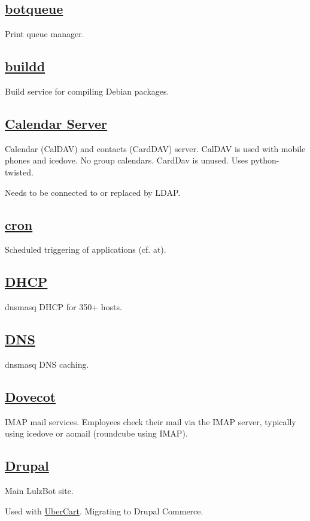 \subsection{\href{http://www.botqueue.org/}{botqueue}}
Print queue manager.

\subsection{\href{http://www.debian.org/}{buildd}}
Build service for compiling Debian packages.

\subsection{\href{http://www.calendarserver.org/}{Calendar Server}}
Calendar (CalDAV) and contacts (CardDAV) server. CalDAV is used with mobile
phones and icedove. No group calendars. CardDav is unused. Uses python-twisted.

Needs to be connected to or replaced by LDAP.

\subsection{\href{http://ftp.isc.org/isc/cron/}{cron}}
Scheduled triggering of applications (cf. at).

\subsection{\href{http://dnsmasq.org/}{DHCP}}
dnsmasq DHCP for 350+ hosts.

\subsection{\href{http://dnsmasq.org/}{DNS}}
dnsmasq DNS caching.

\subsection{\href{http://dnsmasq.org/}{Dovecot}}
IMAP mail services. Employees check their mail via the
IMAP server, typically using icedove or aomail (roundcube using IMAP).

\subsection{\href{http://www.drupal.org}{Drupal}}
Main LulzBot site.

Used with \href{http://www.ubercart.org/}{UberCart}.
Migrating to Drupal Commerce.

